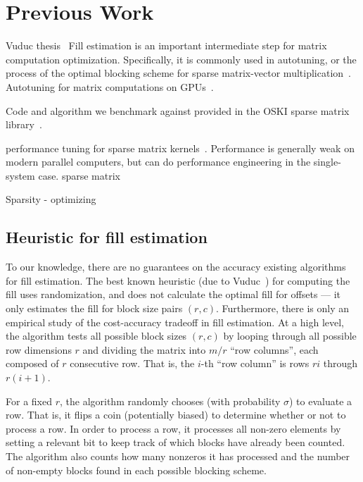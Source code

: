 
\section{Previous Work}
    Vuduc thesis~\cite{vuduc04}
Fill estimation is an important intermediate step for matrix computation optimization. Specifically, it is commonly used in autotuning, or the process of the optimal blocking scheme for sparse matrix-vector multiplication~\cite{WillOlVu09, VuducDeYe02, YilmAkGa16, VuducMo05}. Autotuning for matrix computations on GPUs~\cite{ChoiSiVu10}.

Code and algorithm we benchmark against provided in the {OSKI} sparse matrix library~\cite{VuducDeYe05}.

performance tuning for sparse matrix kernels~\cite{ImYeVu04, ImYe01}. Performance is generally weak on modern parallel computers, but can do performance engineering in the single-system case. 
sparse matrix


{Sparsity} - optimizing 

\subsection{Heuristic for fill estimation}

To our knowledge, there are no guarantees on the accuracy existing algorithms for fill estimation. The best known heuristic (due to Vuduc~\cite{vuduc04}) for computing the fill uses randomization, and does not calculate the optimal fill for offsets --- it only estimates the fill for block size pairs $(r,c)$. Furthermore, there is only an empirical study of the cost-accuracy tradeoff in fill estimation. At a high level, the algorithm tests all possible block sizes $(r,c)$ by looping through all possible row dimensions $r$ and dividing the matrix into $m/r$ ``row columns'', each composed of $r$ consecutive row. That is, the $i$-th ``row column'' is rows $ri$ through $r(i+1)$.

For a fixed $r$, the algorithm randomly chooses (with probability $\sigma$) to evaluate a row. That is, it flips a coin (potentially biased) to determine whether or not to process a row. In order to process a row, it processes all non-zero elements by setting a relevant bit to keep track of which blocks have already been counted. The algorithm also counts how many nonzeros it has processed and the number of non-empty blocks found in each possible blocking scheme.

